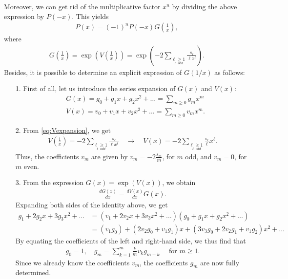 \documentclass[a4paper]{report}
\begin{document}
Moreover, we can get rid of the multiplicative factor $x^n$ by dividing the above expression by $P(-x)$. This yields
\begin{align}\label{eq:Pexpansion}
	P(x) = (-1)^nP(-x)G\left(\frac 1x\right),
\end{align}
where
\begin{align}\label{eq:Vexpansion}
	G\left(\frac 1x\right) = \exp\left(V\left(\frac 1x\right)\right) = \exp\left(-2\sum_{\underset{\ell\; odd}{\ell\geq 1}} \frac{s_\ell}{\ell x^\ell}\right).
\end{align}
Besides, it is possible to determine an explicit expression of $G(1/x)$ as follows:
\begin{itemize}
	\item[1.] First of all, let us introduce the series expansion of $G(x)$ and $V(x)$:
	\begin{align*}
		& G(x) = g_0 + g_1x + g_2x^2 + \ldots = \sum_{m\geq 0} g_mx^m
		\\
		& V(x) = v_0 + v_1x + v_2x^2 + \ldots = \sum_{m\geq 0} v_mx^m.
	\end{align*} 
	
	\item[2.] From \eqref{eq:Vexpansion}, we get
	\begin{align*}
		V\left(\frac 1x\right) = -2\sum_{\underset{\ell\; odd}{\ell\geq 1}} \frac{s_\ell}{\ell x^\ell} \quad\longrightarrow\quad V(x) = -2\sum_{\underset{\ell\; odd}{\ell\geq 1}} \frac{s_\ell}{\ell} x^\ell.
	\end{align*}
	Thus, the coefficients $v_m$ are given by $v_m=-2\frac{s_m}{m}$, for $m$ odd, and $v_m=0$, for $m$ even.
	
	\item[3.] From the expression $G(x) = \exp(V(x))$, we obtain
	\begin{align*}
		\frac{dG(x)}{dx} = \frac{dV(x)}{dx}G(x).
	\end{align*}
	Expanding both sides of the identity above, we get
	\begin{align*}
		g_1 + 2g_2x + 3g_3x^2 + \ldots &= (v_1 + 2v_2x + 3v_3x^2 + \ldots)(g_0 + g_1x + g_2x^2 + \ldots)
		\\
		&= (v_1g_0) + (2v_2g_0 + v_1g_1)x + (3v_3g_0 + 2v_2g_1 + v_1g_2)x^2 + \ldots 
	\end{align*}
	By equating the coefficients of the left and right-hand side, we thus find that
	\begin{align*}
		g_0 = 1, \quad g_m = \sum_{k=1}^m \frac km v_kg_{m-k}\quad\mbox{ for } m\geq 1.
	\end{align*}
	Since we already know the coefficients $v_m$, the coefficients $g_m$ are now fully determined.
\end{itemize}
\end{document}
